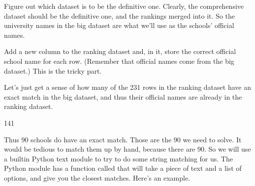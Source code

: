 \documentclass[letterpaper,10pt,english]{jupyterBook}
\begin{document}
\sphinxAtStartPar
{} Figure out which dataset is to be the definitive one.  Clearly, the comprehensive dataset should be the definitive one, and the rankings merged into it.  So the university names in the big dataset are what we’ll use as the schools’ official names.

\sphinxAtStartPar
{} Add a new column to the ranking dataset and, in it, store the correct official school name for each row.  (Remember that official names come from the big dataset.)  This is the tricky part.

\sphinxAtStartPar
Let’s just get a sense of how many of the 231 rows in the ranking dataset have an exact match in the big dataset, and thus their official names are already in the ranking dataset.

\begin{sphinxVerbatim}[commandchars=\\\{\}]
   \PYG{p}{[}\PYG{p}{]}         
 \PYG{p}{[}\PYG{p}{]}     
\end{sphinxVerbatim}

\begin{sphinxVerbatim}[commandchars=\\\{\}]
141
\end{sphinxVerbatim}

\sphinxAtStartPar
Thus 90 schools do  have an exact match.  Those are the 90 we need to solve.  It would be tedious to match them up by hand, because there are 90.  So we will use a built\sphinxhyphen{}in Python text module to try to do some  string matching for us.  The Python module  has a function called  that will take a piece of text and a list of options, and give you the closest matches.  Here’s an example.

\begin{sphinxVerbatim}[commandchars=\\\{\}]
   
 
    \PYG{p}{[}  
        \PYG{p}{]} 
\end{sphinxVerbatim}
\end{document}
